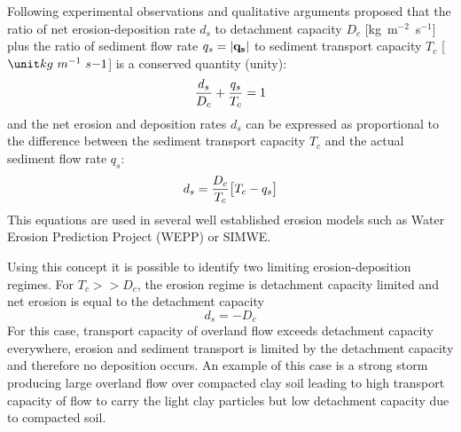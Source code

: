 \documentclass[gmd, manuscript]{copernicus}
\begin{document}
Following experimental observations and qualitative arguments \cite{fostermeyer72} 
proposed that the ratio of net erosion-deposition rate $d_s$ to detachment
 capacity  $D_c$  [\unit{kg~m}$^{-2}$~\unit{s}$^{-1}$] 
 plus the ratio of sediment flow rate $q_s = |{\bf q_s}|$ 
to sediment transport capacity $T_c$ [$\unit kg~m^{-1}~s{-1}$] is
 a conserved quantity (unity):
\begin{equation}
\label{eq:foster_law}
{d_s \over D_c} + {q_s \over T_c} = 1
\end{equation}
and the net erosion and deposition rates $d_s$ can be expressed as proportional to the difference between
the sediment transport capacity $T_c$ and the actual sediment flow rate $q_s$:
\begin{equation}
\label{eq:sigma}
d_s = {D_c \over T_c} \bigl[ T_c - q_s\bigr]
\end{equation}
\noindent
This equations are used in several well established erosion models such as Water Erosion Prediction Project (WEPP)
\citep{Flanagan2013} or SIMWE. 

Using this concept it is possible to identify two limiting erosion-deposition regimes.
For $T_c >> D_c$, the erosion regime is detachment capacity limited and
net erosion is equal to the detachment capacity
\begin{equation}
\label{eq:detachment_limited}
 d_s = -D_c
\end{equation}
For this case, transport capacity of overland flow exceeds
detachment capacity everywhere, erosion and sediment transport is limited by the detachment
capacity and therefore no deposition occurs.
An example of this case is a strong storm producing large overland flow over compacted clay soil 
leading to high transport capacity of flow to carry the light clay particles
but low detachment capacity due to compacted soil.
\end{document}

